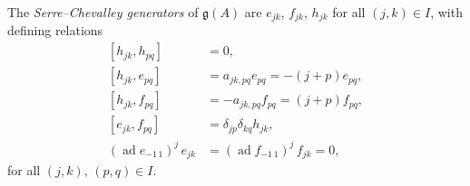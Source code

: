 \documentclass[11pt,letterpaper]{amsart}
\numberwithin{thecounter}{section}
\theoremstyle{definition}
\DeclareMathOperator{\ad}{ad}
\newcommand{\Z}{{\mathbb Z}}
\newcommand{\C}{{\mathbb C}}
\begin{document}
%


The \emph{Serre--Chevalley generators} of $\mathfrak{g}(A)$ are 
$e_{jk}$, $f_{jk}$, $h_{jk}$ for all $(j,k)\in  I$, with
 defining relations 
\begin{align*}
\tag{R:1}\label{Rmhh} \left[h_{jk},h_{pq}\right]&=0,\\
\tag{R:2}\label{Rmhe} \left[h_{jk},{e}_{pq} \right]&=a_{jk,pq}{e}_{pq} =-(j+p) {e}_{pq},\\
\tag{R:3}\label{Rmhf} \left[h_{jk},{f}_{pq} \right]&=-a_{jk,pq}{f}_{pq} =(j+p) {f}_{pq},\\
\tag{R:4}\label{Rmef} \left[{e}_{jk},{f}_{pq} \right]&=\delta_{jp}\delta_{kq}h_{jk},\\ 
\tag{R:5}\label{Rmee} \left(\ad {e}_{-1\,1} \right)^j \,{e}_{jk}&= \left(\ad {f}_{-1\,1} \right)^j \,{f}_{jk}=0,
\end{align*}
for all $(j,k),\,(p,q) \in {I}$. 
\end{document}
